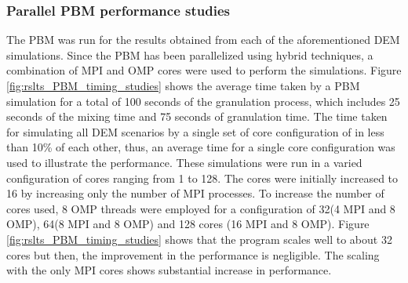 \documentclass[preprint,11pt,authoryear]{elsarticle}
\begin{document}
\subsubsection{Parallel PBM performance studies}
 The PBM was run for the results obtained from each of the aforementioned DEM simulations. 
Since the PBM has been parallelized using hybrid techniques, a combination of MPI and OMP cores 
were used to perform the simulations. Figure \ref{fig:rslts_PBM_timing_studies} shows the average time 
taken by a PBM simulation for a total of 100 seconds of the granulation process, which includes 25 
seconds of the mixing time and 75 seconds of granulation time. The time taken for simulating all DEM 
scenarios by a single set of core configuration of in less than 10\% of each other, thus, an  average 
time for a single core configuration was used to illustrate the performance. 
These simulations were run in a varied configuration of cores ranging from 1 to 128. The cores were 
initially increased to 16 by increasing only the number of MPI processes. To increase the number of 
cores used, 8 OMP threads were employed for a configuration of 32(4 MPI  and 8 OMP), 64(8 MPI  and 8 OMP) 
and 128 cores (16 MPI  and 8 OMP). Figure \ref{fig:rslts_PBM_timing_studies} shows that the program scales 
well to about 32 cores but then, the improvement in the performance is negligible. The scaling with the 
only MPI cores shows substantial increase in performance. \\
\end{document}
